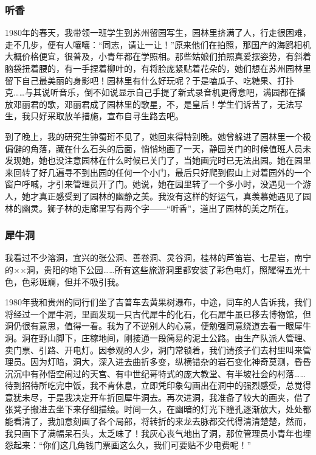\documentclass{article}
\begin{document}
\subsubsection{听香}
1980年的春天，我带领一班学生到苏州留园写生，园林里挤满了人，行走很困难，走不几步，便有人嚷嚷：“同志，请让一让！”原来他们在拍照，那国产的海鸥相机大概价格便宜，很普及，小青年都在学照相。那些姑娘们拍照真爱摆姿势，有斜着脑袋扭着腰的，有一手捏着柳叶的，有将脸庞紧贴着花朵的，她们想在苏州园林里留下自己最美丽的身影吧！园林里有什么好玩呢？于是嗑瓜子、吃糖果、打扑克……与其说听音乐，倒不如说显示自己手提了新式录音机更得意吧，满园都在播放邓丽君的歌，邓丽君成了园林里的歌星，不，是皇后！学生们诉苦了，无法写生，我只好采取放羊措施，宣布自寻生路去吧。

到了晚上，我的研究生钟蜀珩不见了，她回来得特别晚。她曾躲进了园林里一个极偏僻的角落，藏在什么石头的后面，悄悄地画了一天，静园关门的时候值班人员未发现她，她也没注意园林在什么时候已关门了，当她画完时已无法出园。她在园里来回转了好几遍寻不到出园的任何一个小门，最后只好爬到假山上对着园外的一个窗户呼喊，才引来管理员开了门。她说，她在园里转了一个多小时，没遇见一个游人，她才真正感受到了园林的幽静之美。我没有这样的好运气，真羡慕她遇见了园林的幽灵。狮子林的走廊里写有两个字——“听香”，道出了园林的美之所在。
\subsubsection{犀牛洞}
我看过不少溶洞，宜兴的张公洞、善卷洞、灵谷洞，桂林的芦笛岩、七星岩，南宁的××洞，贵阳的地下公园……所有这些旅游洞里都安装了彩色电灯，照耀得五光十色，色彩斑斓，但并不吸引我。

1980年我和贵州的同行们坐了吉普车去黄果树瀑布，中途，同车的人告诉我，我们将经过一个犀牛洞，里面发现一只古代犀牛的化石，化石犀牛虽已移去博物馆，但洞仍很有意思，值得一看。我为了不逆别人的心意，便勉强同意绕道去看一眼犀牛洞。洞在野山脚下，庄稼地间，刚接通一段简易的泥土公路。由生产队派人管理、卖门票、引路、开电灯。因参观的人少，洞门常锁着，我们请孩子们去村里叫来管理员。因为灯暗，洞大，深入进去曲折多变，纵横错杂的岩石变化神奇莫测，昏昏沉沉中有孙悟空闹过的天宫、有中世纪哥特式的庞大教堂、有半坡社会的村落……待到招待所吃完中饭，我不肯休息，立即凭印象勾画出在洞中的强烈感受，总觉得意犹未尽，于是我决定开车折回犀牛洞去。再次进洞，我准备了较大的画夹，借了张凳子搬进去坐下来仔细描绘。时间一久，在幽暗的灯光下瞳孔逐渐放大，处处都能看清了，我加意刻画了各个局部，将转折的来龙去脉都交代得清清楚楚，然而，我只画下了满幅呆石头，太乏味了！我灰心丧气地出了洞，那位管理员小青年也埋怨起来：“你们这几角钱门票画这么久，我们可要贴不少电费呢！”
\end{document}
